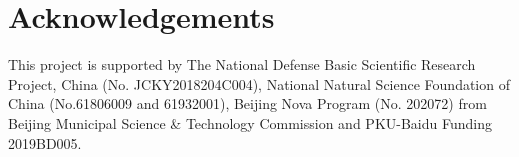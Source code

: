 \documentclass[letterpaper]{article} \usepackage{aaai21}  \usepackage{times}  \usepackage{helvet} \usepackage{courier}  \usepackage[hyphens]{url}  \usepackage{graphicx} \urlstyle{rm} \def\UrlFont{\rm}  \usepackage{natbib}  \usepackage{caption} \frenchspacing  \setlength{\pdfpagewidth}{8.5in}  \setlength{\pdfpageheight}{11in}  \usepackage{multirow}
\begin{document}
\section{Acknowledgements}
This project is supported by The National Defense Basic Scientific Research Project, China (No. JCKY2018204C004), National Natural Science Foundation  of  China  (No.61806009 and 61932001),  Beijing Nova Program (No. 202072) from Beijing Municipal Science \& Technology Commission and PKU-Baidu Funding 2019BD005.

\end{document}
